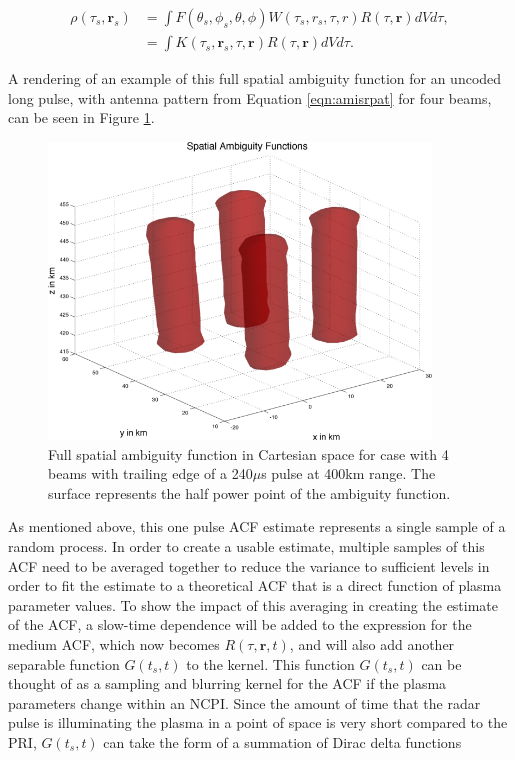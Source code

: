  \begin{align}
  \label{eqn:volume}
\rho(\tau_s,\mathbf{r}_s) &= \int F(\theta_s,\phi_s,\theta,\phi)W(\tau_s,r_s,\tau,r) R(\tau,\mathbf{r}) dV d\tau ,\\
	&= \int K(\tau_s,\mathbf{r}_s,\tau,\mathbf{r}) R(\tau,\mathbf{r})  dVd\tau.
\end{align}

A rendering of an example of this full spatial ambiguity function for an uncoded long pulse, with antenna pattern from Equation \ref{eqn:amisrpat} for four beams, can be seen in Figure \ref{fig:amb4}.

\begin{figure}
	\centering
	\includegraphics[width=4in]{spaceamb}
	\caption{Full spatial ambiguity function in Cartesian space for case with 4 beams with trailing edge of a 240$\mu$s pulse at 400km range. The surface represents the half power point of the ambiguity function.}	
	\label{fig:amb4}
\end{figure}

As mentioned above, this one pulse ACF estimate represents a single sample of a random process. In order to create a usable estimate, multiple samples of this ACF need to be averaged together to reduce the variance to sufficient levels in order to fit the estimate to a theoretical ACF that is a direct function of plasma parameter values. To show the impact of this averaging in creating the estimate of the ACF, a slow-time dependence will be added to the expression for the medium ACF, which now becomes $R(\tau,\mathbf{r},t)$, and will also add another separable function $G(t_s,t)$ to the kernel. This function $G(t_s,t)$ can be thought of as a sampling and blurring kernel for the ACF if the plasma parameters change within an NCPI. Since the amount of time that the radar pulse is illuminating the plasma in a point of space is very short compared to the PRI, $G(t_s,t)$ can take the form of a summation of Dirac delta functions 

